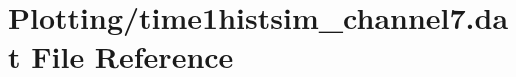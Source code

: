 \hypertarget{Plotting_2time1histsim__channel7_8dat}{}\section{Plotting/time1histsim\+\_\+channel7.dat File Reference}
\label{Plotting_2time1histsim__channel7_8dat}
